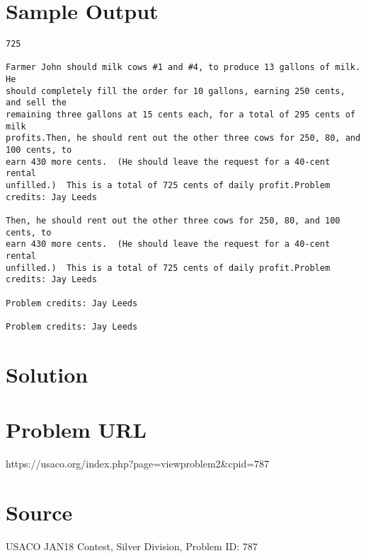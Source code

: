 \documentclass[12pt]{article}
\begin{document}
\section*{Sample Output}
\begin{verbatim}
725

Farmer John should milk cows #1 and #4, to produce 13 gallons of milk.  He
should completely fill the order for 10 gallons, earning 250 cents, and sell the
remaining three gallons at 15 cents each, for a total of 295 cents of milk
profits.Then, he should rent out the other three cows for 250, 80, and 100 cents, to
earn 430 more cents.  (He should leave the request for a 40-cent rental
unfilled.)  This is a total of 725 cents of daily profit.Problem credits: Jay Leeds

Then, he should rent out the other three cows for 250, 80, and 100 cents, to
earn 430 more cents.  (He should leave the request for a 40-cent rental
unfilled.)  This is a total of 725 cents of daily profit.Problem credits: Jay Leeds

Problem credits: Jay Leeds

Problem credits: Jay Leeds
\end{verbatim}

\section*{Solution}


\section*{Problem URL}
https://usaco.org/index.php?page=viewproblem2&cpid=787

\section*{Source}
USACO JAN18 Contest, Silver Division, Problem ID: 787
\end{document}
